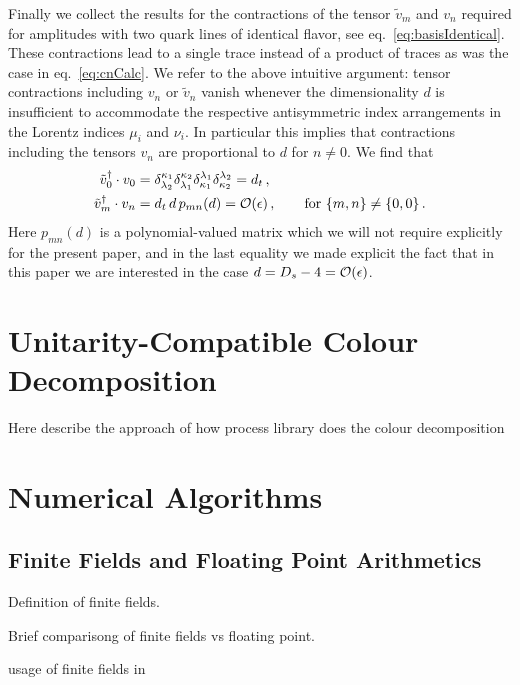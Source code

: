 Finally we collect the results for the contractions of the 
tensor $\tilde v_m$ and $v_n$ required for amplitudes with two
quark lines of identical flavor,
see eq.~\eqref{eq:basisIdentical}.
These contractions lead to a single trace instead of a product 
of traces as was the case in eq.~\eqref{eq:cnCalc}.
We refer to the above intuitive argument: tensor 
contractions including $v_n$ or $\tilde v_n$ vanish 
whenever the dimensionality $d$ is insufficient to accommodate
the respective antisymmetric index arrangements in the Lorentz 
indices $\mu_i$ and $\nu_i$.
In particular this implies that contractions including the
tensors $v_{n}$ are proportional to $d$ for $n\neq0$. We find
that 
\begin{align}\begin{split}
\tilde v_0^\dagger \cdot v_0 &=
\delta^{\kappa_1}_{\lambda_2} \delta^{\kappa_2}_{\lambda_1}
\delta_{\kappa_1}^{\lambda_1} \delta_{\kappa_2}^{\lambda_2} 
= d_t \,, \\
\tilde v_m^\dagger \cdot v_{n} &=d_t\,d\,p_{mn}(d) = 
{\cal O}(\epsilon)\,,\qquad\textrm{for }\{m,n\}\neq\{0,0\}\,.
\end{split}\end{align}
%
Here $p_{mn}(d)$ is a polynomial-valued matrix which we 
will not require explicitly for the present paper, and in the
last equality we made explicit the fact that in this paper we 
are interested in the case $d=D_s-4={\cal O}(\epsilon)$.



\chapter{Unitarity-Compatible Colour Decomposition}
Here describe the approach of how process library does the colour decomposition


\chapter{Numerical Algorithms}

\section{Finite Fields and Floating Point Arithmetics}

Definition of finite fields.

Brief comparisong of finite fields vs floating point.

usage of finite fields in \cite{Klappert:2019emp,Peraro:2016wsq,Peraro:2019svx}

